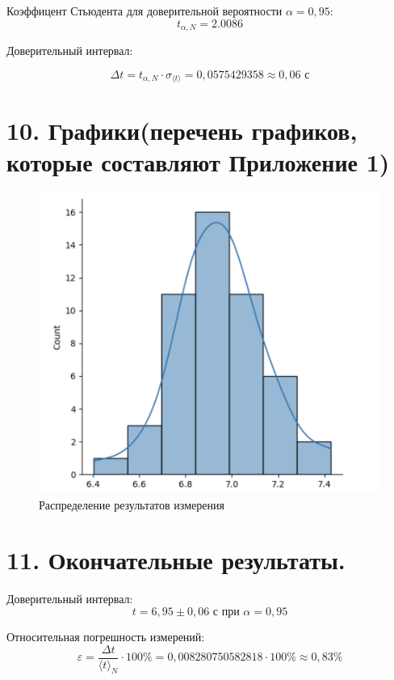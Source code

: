 \documentclass[14pt]{extreport}
\begin{document}
Коэффицент Стьюдента для доверительной вероятности $\alpha = 0,95$: $$t_{\alpha, N} = 2.0086$$

Доверительный интервал:

$$\Delta t = t_{\alpha, N} \cdot \sigma_{\langle t \rangle} = 0,0575429358 \approx 0,06 \text{ с}$$

\section*{10. Графики(перечень графиков, которые составляют Приложение 1)}
\begin{figure}[H]
	\begin{center}
		\includegraphics[scale=1]{dristogramma.png}
		\caption{Распределение результатов измерения}
		\label{pic}
	\end{center}
\end{figure}

\section*{11. Окончательные результаты.}
Доверительный интервал:
\begin{equation*}
    t = 6,95 \pm 0,06 \text{ с при } \alpha = 0,95
\end{equation*}

Относительная погрешность измерений:
\begin{equation*}
    \varepsilon = \frac{\Delta t}{\langle t \rangle_N} \cdot 100\% = 0,008280750582818 \cdot 100\% \approx 0,83\%
\end{equation*}
\end{document}
